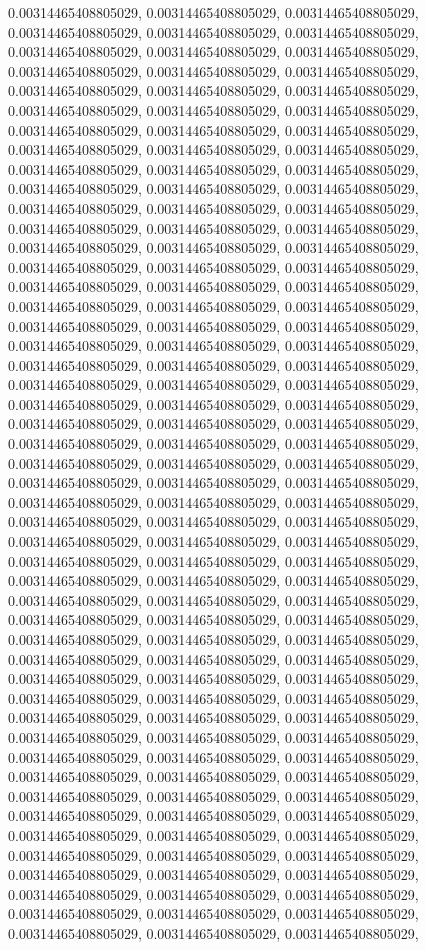 \documentclass[
  ,man]{apa6}
\begin{document}
0.00314465408805029, 0.00314465408805029, 0.00314465408805029, 0.00314465408805029, 0.00314465408805029, 0.00314465408805029, 0.00314465408805029, 0.00314465408805029, 0.00314465408805029, 0.00314465408805029, 0.00314465408805029, 0.00314465408805029, 0.00314465408805029, 0.00314465408805029, 0.00314465408805029, 0.00314465408805029, 0.00314465408805029, 0.00314465408805029, 0.00314465408805029, 0.00314465408805029, 0.00314465408805029, 0.00314465408805029, 0.00314465408805029, 0.00314465408805029,
0.00314465408805029, 0.00314465408805029, 0.00314465408805029, 0.00314465408805029, 0.00314465408805029, 0.00314465408805029, 0.00314465408805029, 0.00314465408805029, 0.00314465408805029, 0.00314465408805029, 0.00314465408805029, 0.00314465408805029, 0.00314465408805029, 0.00314465408805029, 0.00314465408805029, 0.00314465408805029, 0.00314465408805029, 0.00314465408805029, 0.00314465408805029, 0.00314465408805029, 0.00314465408805029, 0.00314465408805029, 0.00314465408805029, 0.00314465408805029,
0.00314465408805029, 0.00314465408805029, 0.00314465408805029, 0.00314465408805029, 0.00314465408805029, 0.00314465408805029, 0.00314465408805029, 0.00314465408805029, 0.00314465408805029, 0.00314465408805029, 0.00314465408805029, 0.00314465408805029, 0.00314465408805029, 0.00314465408805029, 0.00314465408805029, 0.00314465408805029, 0.00314465408805029, 0.00314465408805029, 0.00314465408805029, 0.00314465408805029, 0.00314465408805029, 0.00314465408805029, 0.00314465408805029, 0.00314465408805029,
0.00314465408805029, 0.00314465408805029, 0.00314465408805029, 0.00314465408805029, 0.00314465408805029, 0.00314465408805029, 0.00314465408805029, 0.00314465408805029, 0.00314465408805029, 0.00314465408805029, 0.00314465408805029, 0.00314465408805029, 0.00314465408805029, 0.00314465408805029, 0.00314465408805029, 0.00314465408805029, 0.00314465408805029, 0.00314465408805029, 0.00314465408805029, 0.00314465408805029, 0.00314465408805029, 0.00314465408805029, 0.00314465408805029, 0.00314465408805029,
0.00314465408805029, 0.00314465408805029, 0.00314465408805029, 0.00314465408805029, 0.00314465408805029, 0.00314465408805029, 0.00314465408805029, 0.00314465408805029, 0.00314465408805029, 0.00314465408805029, 0.00314465408805029, 0.00314465408805029, 0.00314465408805029, 0.00314465408805029, 0.00314465408805029, 0.00314465408805029, 0.00314465408805029, 0.00314465408805029, 0.00314465408805029, 0.00314465408805029, 0.00314465408805029, 0.00314465408805029, 0.00314465408805029, 0.00314465408805029,
0.00314465408805029, 0.00314465408805029, 0.00314465408805029, 0.00314465408805029, 0.00314465408805029, 0.00314465408805029, 0.00314465408805029, 0.00314465408805029, 0.00314465408805029, 0.00314465408805029, 0.00314465408805029, 0.00314465408805029, 0.00314465408805029, 0.00314465408805029, 0.00314465408805029, 0.00314465408805029, 0.00314465408805029, 0.00314465408805029, 0.00314465408805029, 0.00314465408805029, 0.00314465408805029, 0.00314465408805029, 0.00314465408805029, 0.00314465408805029,
\end{document}
